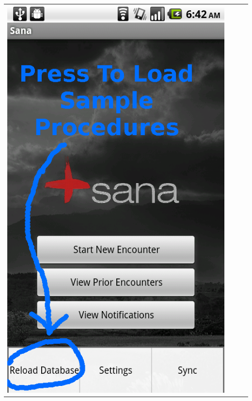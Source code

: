 \documentclass[a4paper,10pt]{article}
\begin{document}
\begin{flushleft}
\begin{tabular}{ c c c c }
\includegraphics[scale=0.15,keepaspectratio=true]{sana_splash_load_db.png}

\end{tabular}
\end{flushleft}
\end{document}
